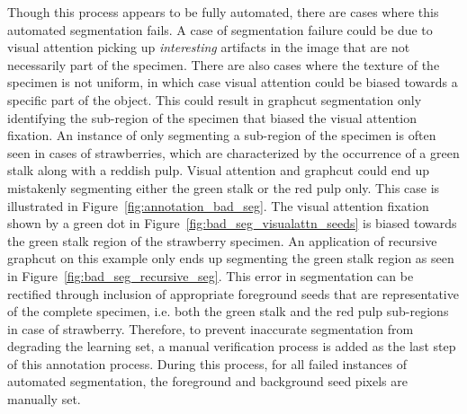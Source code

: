 \documentclass {udthesis}
\begin{document}
Though this process appears to be fully automated, there are cases where this automated segmentation fails. A case of segmentation failure could be due to visual attention picking up \emph{interesting} artifacts in the image that are not necessarily part of the specimen. There are also cases where the texture of the specimen is not uniform, in which case visual attention could be biased towards a specific part of the object. This could result in graphcut segmentation only identifying the sub-region of the specimen that biased the visual attention fixation. An instance of only segmenting a sub-region of the specimen is often seen in cases of strawberries, which are characterized by the occurrence of a green stalk along with a reddish pulp. Visual attention and graphcut could end up mistakenly segmenting either the green stalk or the red pulp only. This case is illustrated in Figure~\ref{fig:annotation_bad_seg}. The visual attention fixation shown by a green dot in Figure~\ref{fig:bad_seg_visualattn_seeds} is 
biased towards the green stalk region of the strawberry specimen. An application of recursive graphcut on this example only ends up segmenting the green stalk region as seen in Figure~\ref{fig:bad_seg_recursive_seg}. This error in segmentation can be rectified through inclusion of appropriate foreground seeds that are representative of the complete specimen, i.e. both the green stalk and the red pulp sub-regions in case of strawberry. Therefore, to prevent inaccurate segmentation from degrading the learning set, a manual verification process is added as the last step of this annotation process. During this process, for all failed instances of automated segmentation, the foreground and background seed pixels are manually set. 
%
\end{document}
